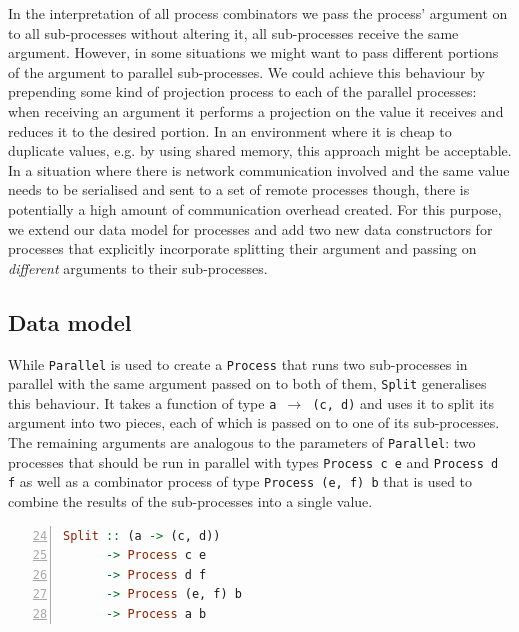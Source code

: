 In the interpretation of all process combinators we pass the process' argument on to all sub-processes without altering it, all sub-processes receive the same argument. However, in some situations we might want to pass different portions of the argument to parallel sub-processes. We could achieve this behaviour by prepending some kind of projection process to each of the parallel processes: when receiving an argument it performs a projection on the value it receives and reduces it to the desired portion. In an environment where it is cheap to duplicate values, e.g. by using shared memory, this approach might be acceptable. In a situation where there is network communication involved and the same value needs to be serialised and sent to a set of remote processes though, there is potentially a high amount of communication overhead created. For this purpose, we extend our data model for processes and add two new data constructors for processes that explicitly incorporate splitting their argument and passing on \textit{different} arguments to their sub-processes. 

\subsection{Data model}
While \texttt{Parallel} is used to create a \texttt{Process} that runs two sub-processes in parallel with the same argument passed on to both of them, \texttt{Split} generalises this behaviour. It takes a function of type \texttt{a $\to$ (c, d)} and uses it to split its argument into two pieces, each of which is passed on to one of its sub-processes. The remaining arguments are analogous to the parameters of \texttt{Parallel}: two processes that should be run in parallel with types \texttt{Process c e} and \texttt{Process d f} as well as a combinator process of type \texttt{Process (e, f) b} that is used to combine the results of the sub-processes into a single value.
\begin{lstlisting}[language=Haskell,caption=Signature of the \texttt{Split} data constructor.,numbers=left,frame=bt,firstnumber=24]
Split :: (a -> (c, d))
      -> Process c e
      -> Process d f
      -> Process (e, f) b
      -> Process a b
\end{lstlisting}

